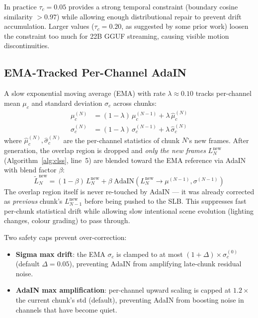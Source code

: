 \documentclass[12pt]{article}
\begin{document}
In practice $\tau_c=0.05$ provides a strong temporal constraint
(boundary cosine similarity $>0.97$) while allowing enough distributional
repair to prevent drift accumulation.  Larger values ($\tau_c=0.20$, as
suggested by some prior work) loosen the constraint too much for 22B GGUF
streaming, causing visible motion discontinuities.

\subsection{EMA-Tracked Per-Channel AdaIN}
\label{sec:adain}

A slow exponential moving average (EMA) with rate $\lambda \approx 0.10$
tracks per-channel mean $\mu_c$ and standard deviation $\sigma_c$ across chunks:
\begin{align}
\mu_c^{(N)} &= (1-\lambda)\,\mu_c^{(N-1)} + \lambda\,\hat\mu_c^{(N)} \\
\sigma_c^{(N)} &= (1-\lambda)\,\sigma_c^{(N-1)} + \lambda\,\hat\sigma_c^{(N)}
\end{align}
where $\hat\mu_c^{(N)}, \hat\sigma_c^{(N)}$ are the per-channel statistics of
chunk $N$'s new frames.  After generation, the overlap region is dropped and
\emph{only the new frames} $L_N^{\text{new}}$ (Algorithm~\ref{alg:clss},
line~5) are blended toward the EMA reference via AdaIN with blend factor
$\beta$:
\begin{equation}
\tilde{L}_N^{\text{new}} = (1-\beta)\,L_N^{\text{new}} + \beta\;\text{AdaIN}(L_N^{\text{new}} \to \mu^{(N-1)}, \sigma^{(N-1)})
\end{equation}
The overlap region itself is never re-touched by AdaIN --- it was already
corrected as \emph{previous} chunk's $L_{N-1}^{\text{new}}$ before being pushed
to the SLB.  This suppresses fast per-chunk statistical drift while allowing
slow intentional scene evolution (lighting changes, colour grading) to pass
through.

Two safety caps prevent over-correction:
\begin{itemize}[noitemsep]
\item \textbf{Sigma max drift}: the EMA $\sigma_c$ is clamped to at most
  $(1+\Delta)\times\sigma_c^{(0)}$ (default $\Delta=0.05$), preventing AdaIN
  from amplifying late-chunk residual noise.
\item \textbf{AdaIN max amplification}: per-channel upward scaling is capped
  at $1.2\times$ the current chunk's std (default), preventing AdaIN from
  boosting noise in channels that have become quiet.
\end{itemize}
\end{document}

